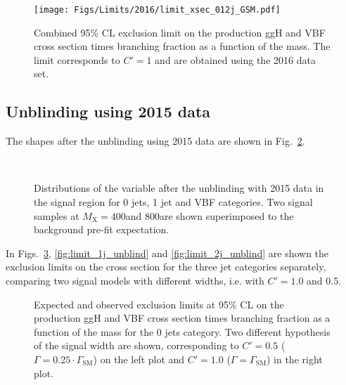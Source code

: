 \begin{figure}[htb]
\centering
\texttt{[image: Figs/Limits/2016/limit\_xsec\_012j\_GSM.pdf]}
\caption{
    Combined 95\% CL exclusion limit on the production ggH and VBF cross section times branching fraction as a function of the mass. The limit corresponds to $C'=1$ and are obtained using the 2016 data set.}
    \label{fig:limit_xsec_comb_2016}
\end{figure}






\clearpage
\subsection{Unblinding using 2015 data}

The \mt shapes after the unblinding using 2015 data are shown in Fig.~\ref{fig:shapes_unblinded}.

\begin{figure}[htb]
\centering
{}
\\
\caption{
    Distributions of the \mt variable after the unblinding with 2015 data in the signal region for 0 jets, 1 jet and VBF categories. Two signal samples at $M_\mathrm{X} = 400$\GeV and 800\GeV are shown superimposed to the background pre-fit expectation.}
    \label{fig:shapes_unblinded}
\end{figure}

In Figs.~\ref{fig:limit_0j_unblind}, \ref{fig:limit_1j_unblind} and \ref{fig:limit_2j_unblind} are shown the exclusion limits on the cross section for the three jet categories separately, comparing two signal models with different widths, i.e. with $C' = 1.0$ and 0.5.


\begin{figure}[htb]
\centering
{}
\caption{
   Expected and observed exclusion limits at 95\% CL on the production ggH and VBF cross section times branching fraction as a function of the mass for the 0 jets category. Two different hypothesis of the signal width are shown, corresponding to $C'=0.5$ ($\Gamma = 0.25\cdot\Gamma_\mathrm{SM}$) on the left plot and $C'=1.0$ ($\Gamma = \Gamma_\mathrm{SM}$) in the right plot.}
    \label{fig:limit_0j_unblind}
\end{figure}

